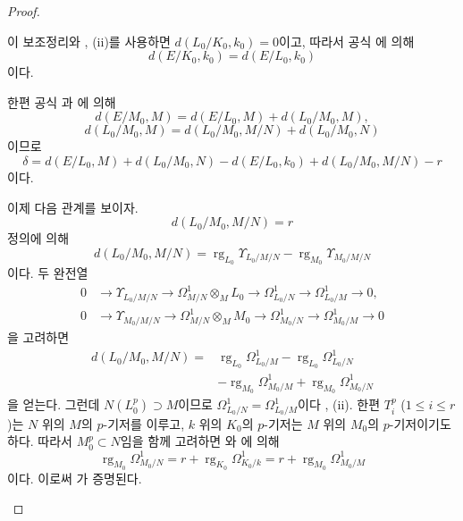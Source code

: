 \begin{proof}
\begin{enumerate}
  이 보조정리와 , (ii)를 사용하면
  $d(L_0/K_0,k_0)=0$이고, 따라서 공식 에 의해
  \[
    d(E/K_0,k_0)=d(E/L_0,k_0)
  \]
  이다.

  한편 공식 과 에 의해
  \[
    d(E/M_0,M)=d(E/L_0,M)+d(L_0/M_0,M),
  \]
  \[
    d(L_0/M_0,M)=d(L_0/M_0,M/N)+d(L_0/M_0,N)
  \]
  이므로
  \[
    \delta=d(E/L_0,M)+d(L_0/M_0,N)-d(E/L_0,k_0)
    +d(L_0/M_0,M/N)-r
  \]
  이다.

  이제 다음 관계를 보이자.
  \begin{equation}
  \tag{21.9.6.5}
  \label{0.21.9.6.5-ko}
    d(L_0/M_0,M/N)=r
  \end{equation}
  정의에 의해
  \[
    d(L_0/M_0,M/N)
    =\operatorname{rg}_{L_0}\Upsilon_{L_0/M/N}
    -\operatorname{rg}_{M_0}\Upsilon_{M_0/M/N}
  \]
  이다. 두 완전열
  \[
  \begin{aligned}
    0&\longrightarrow\Upsilon_{L_0/M/N}
      \longrightarrow\Omega^1_{M/N}\otimes_ML_0
      \longrightarrow\Omega^1_{L_0/N}
      \longrightarrow\Omega^1_{L_0/M}\longrightarrow0,\\
    0&\longrightarrow\Upsilon_{M_0/M/N}
      \longrightarrow\Omega^1_{M/N}\otimes_MM_0
      \longrightarrow\Omega^1_{M_0/N}
      \longrightarrow\Omega^1_{M_0/M}\longrightarrow0
  \end{aligned}
  \]
  을 고려하면
  \[
  \begin{split}
    d(L_0/M_0,M/N)={}&\operatorname{rg}_{L_0}\Omega^1_{L_0/M}
      -\operatorname{rg}_{L_0}\Omega^1_{L_0/N}\\
      &-\operatorname{rg}_{M_0}\Omega^1_{M_0/M}
      +\operatorname{rg}_{M_0}\Omega^1_{M_0/N}
  \end{split}
  \]
  을 얻는다. 그런데 $N(L_0^p)\supset M$이므로
  $\Omega^1_{L_0/N}=\Omega^1_{L_0/M}$이다
  , (ii). 한편 $T_i^p$ ($1\leqslant i\leqslant r$)는
  $N$ 위의 $M$의 $p$-기저를 이루고, $k$ 위의 $K_0$의 $p$-기저는
  $M$ 위의 $M_0$의 $p$-기저이기도 하다. 따라서 $M_0^p\subset N$임을
  함께 고려하면 와 에 의해
  \[
    \operatorname{rg}_{M_0}\Omega^1_{M_0/N}
    =r+\operatorname{rg}_{K_0}\Omega^1_{K_0/k}
    =r+\operatorname{rg}_{M_0}\Omega^1_{M_0/M}
  \]
  이다. 이로써 가 증명된다.


\end{enumerate}
\end{proof}
